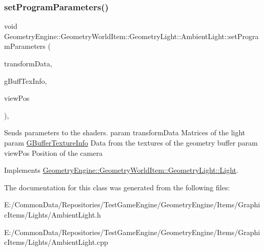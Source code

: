 \subsubsection{\texorpdfstring{setProgramParameters()}{setProgramParameters()}}
{\footnotesize\ttfamily void Geometry\+Engine\+::\+Geometry\+World\+Item\+::\+Geometry\+Light\+::\+Ambient\+Light\+::set\+Program\+Parameters (\begin{DoxyParamCaption}\item[{const \mbox{\hyperlink{class_geometry_engine_1_1_lighting_transformation_data}{Lighting\+Transformation\+Data}} \&}]{transform\+Data,  }\item[{const \mbox{\hyperlink{class_geometry_engine_1_1_g_buffer_texture_info}{G\+Buffer\+Texture\+Info}} \&}]{g\+Buff\+Tex\+Info,  }\item[{const Q\+Vector3D \&}]{view\+Pos }\end{DoxyParamCaption})\hspace{0.3cm}{\ttfamily [protected]}, {\ttfamily [virtual]}}

Sends parameters to the shaders. param transform\+Data Matrices of the light param \mbox{\hyperlink{class_geometry_engine_1_1_g_buffer_texture_info}{G\+Buffer\+Texture\+Info}} Data from the textures of the geometry buffer param view\+Pos Position of the camera 

Implements \mbox{\hyperlink{class_geometry_engine_1_1_geometry_world_item_1_1_geometry_light_1_1_light_a366be5945389fe58df4bf5aa8c43138f}{Geometry\+Engine\+::\+Geometry\+World\+Item\+::\+Geometry\+Light\+::\+Light}}.



The documentation for this class was generated from the following files\+:\begin{DoxyCompactItemize}
\item 
E\+:/\+Common\+Data/\+Repositories/\+Test\+Game\+Engine/\+Geometry\+Engine/\+Items/\+Graphic\+Items/\+Lights/Ambient\+Light.\+h\item 
E\+:/\+Common\+Data/\+Repositories/\+Test\+Game\+Engine/\+Geometry\+Engine/\+Items/\+Graphic\+Items/\+Lights/Ambient\+Light.\+cpp\end{DoxyCompactItemize}
